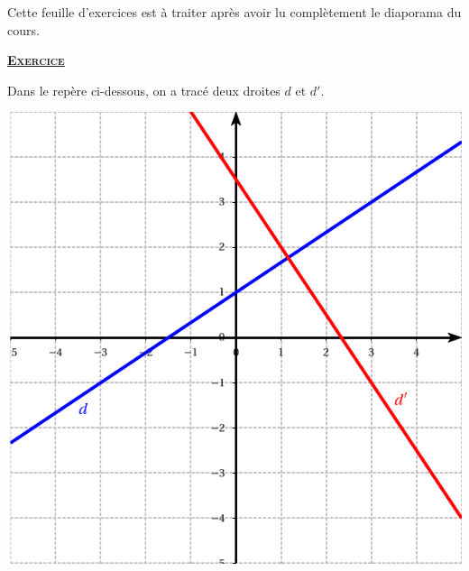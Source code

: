 \begin{center} {\large {}} \end{center} \medskip

Cette feuille d'exercices est à traiter après avoir lu complètement le
diaporama du cours.

 \underline{\textsc{\textbf{Exercice }}}

Dans le repère ci-dessous, on a tracé deux droites \(d\) et \(d'\).

\begin{center}
\includegraphics[scale=1]{graphique.pdf}
\end{center}

